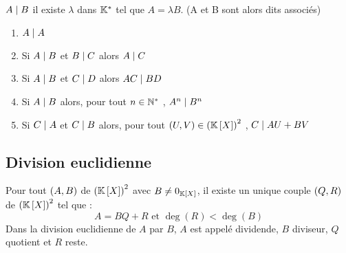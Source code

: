\begin{defprop}
    \(A \mid B\) \ssi il existe \(\lambda\) dans \(\mathbb{K}^*\) tel que \(A = \lambda B\). (A et B sont alors dits associés)
\end{defprop}

\begin{prop}[Propriétés]
    \begin{enumerate}
        \item \(A \mid A\)
        \item Si \(A \mid B\) et \(B \mid C\) alors \(A \mid C\)
        \item Si \(A \mid B\) et \(C \mid D\) alors \(AC \mid BD\)
        \item Si \(A \mid B\) alors, pour tout \(n \in \mathbb{N}^*\) , \(A^n \mid B^n\)
        \item Si \(C \mid A\) et \(C \mid B\) alors, pour tout \(\left(U,V\right) \in \left(\mathbb{K} \left[X\right]\right)^2\) , \(C \mid AU + BV\)
    \end{enumerate}
\end{prop}

\subsection{Division euclidienne}
\begin{theo}
    Pour tout \(\left(A,B\right)\) de \(\left(\mathbb{K} \left[X\right]\right)^2\) avec \(B \neq 0_{\mathbb{K} \left[X\right]}\), il existe un unique couple \(\left(Q,R\right)\) de \(\left(\mathbb{K} \left[X\right]\right)^2\) tel que : 
    \[A = BQ+R \text{ et } \deg(R)< \deg(B)\]
    Dans la division euclidienne de \(A\) par \(B\), \(A\) est appelé dividende, \(B\) diviseur, \(Q\) quotient et \(R\) reste.
\end{theo}

